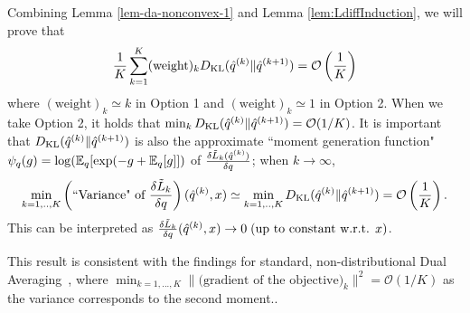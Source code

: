  
Combining Lemma \ref{lem-da-nonconvex-1} and Lemma \ref{lem:LdiffInduction}, 
we will prove that
\begin{equation}
    \frac{1}{K}\sum_{k=1}^K (\text{weight})_k D_{\mathrm{KL}}(\hat{q}^{(k)}\|\hat{q}^{(k+1)}) = \mathcal{O}\left(\frac{1}{K}\right)
\end{equation}
where $(\text{weight})_k \simeq k$ in Option 1 and $(\text{weight})_k \simeq 1$ in Option 2. 
When we take Option 2, it holds that $\min_k D_{\mathrm{KL}}(\hat{q}^{(k)}\|\hat{q}^{(k+1)}) = \mathcal{O}(1/K)$.
It is important that $D_{\mathrm{KL}}(\hat{q}^{(k)}\|\hat{q}^{(k+1)})$ is also the approximate ``moment generation function" $\psi_q(g) = \log (\mathbb{E}_q[\exp(-g+\mathbb{E}_q[g]])$ of $\frac{\delta \tilde{L}_k(\hat{q}^{(k)})}{\delta q}$; when $k \to \infty$,
\begin{equation}
    \min_{k=1,..,K}\left(\text{``Variance" of }\frac{\delta \tilde{L}_k}{\delta q} \right)(\hat{q}^{(k)},x) \simeq \min_{k=1,..,K}D_{\mathrm{KL}}(\hat{q}^{(k)}\|\hat{q}^{(k+1)}) = \mathcal{O}\left(\frac{1}{K}\right).
\end{equation}
This can be interpreted as $\frac{\delta \tilde{L}_k}{\delta q}(\hat{q}^{(k)},x) \to 0\; \text{(up to constant w.r.t. $x$)}$.

This result is consistent with the findings for standard, non-distributional Dual Averaging~\citep{LIU2023nonconvexDA}, where $\min_{k=1,...,K}\|\text{(gradient of the objective)}_k\|^2 = \mathcal{O}(1/K)$ as the variance corresponds to the second moment..


